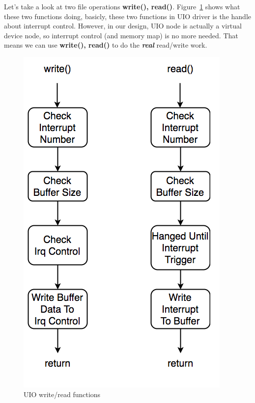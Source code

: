Let's take a look at two file operations \textbf{write(), read()}. Figure~\ref{fig:UIO write andread functions.} shows what these two functions doing, basicly, these two functions in UIO driver is the handle about interrupt control. However, in our design, UIO node is actually a virtual device node, so interrupt control (and memory map) is no more needed. That means we can use \textbf{write(), read()} to do the \emph{\textbf{real}} read/write work.


\begin{figure}[!htb]
  \centering
  \includegraphics[scale=0.5]{images/uio_func_write.png}
  \caption[UIO write/read functions.]{UIO write/read functions}
  \label{fig:UIO write andread functions.}
\end{figure}

